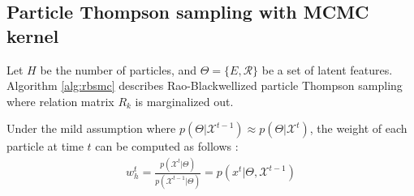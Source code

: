 \documentclass{article}
\begin{document}
\subsection{Particle Thompson sampling with MCMC kernel}
Let $H$ be the number of particles, and $\Theta= \{E, \mathcal{R}\}$ be a set of latent features.
Algorithm \ref{alg:rbsmc} describes Rao-Blackwellized particle Thompson sampling where relation matrix $R_k$ is marginalized out.

Under the mild assumption where $p(\Theta | \mathcal{X}^{t-1}) \approx p(\Theta | \mathcal{X}^{t})$, the weight of each particle at time $t$ can be computed as follows \cite{del2006sequential,chopin2002sequential}:
\begin{align}
w_{h}^{t} = \frac{p(\mathcal{X}^{t} | \Theta)}{p(\mathcal{X}^{t-1} | \Theta)} = p(x^{t} | \Theta, \mathcal{X}^{t-1})
\end{align}


%

%
%
%
\end{document}

